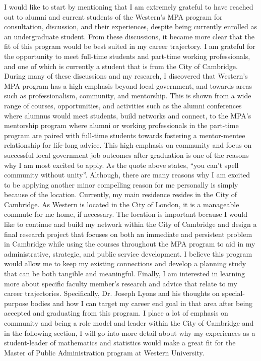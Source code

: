 \documentclass[11pt, a4paper]{awesome-cv}
\begin{document}
\begin{cvletter}
I would like to start by mentioning that I am extremely grateful to have reached out to alumni and current students of the Western's MPA program for consultation, discussion, and their experiences, despite being currently enrolled as an undergraduate student. From these discussions, it became more clear that the fit of this program would be best suited in my career trajectory. I am grateful for the opportunity to meet full-time students and part-time working professionals, and one of which is currently a student that is from the City of Cambridge. During many of these discussions and my research, I discovered that Western's MPA program has a high emphasis beyond local government, and towards areas such as professionalism, community, and mentorship. This is shown from a wide range of courses, opportunities, and activities such as the alumni conferences where alumnus would meet students, build networks and connect, to the MPA's mentorship program where alumni or working professionals in the part-time program are paired with full-time students towards fostering a mentor-mentee relationship for life-long advice. This high emphasis on community and focus on successful local government job outcomes after graduation is one of the reasons why I am most excited to apply. As the quote above states, “you can't spell community without unity”. Although, there are many reasons why I am excited to be applying another minor compelling reason for me personally is simply because of the location. Currently, my main residence resides in the City of Cambridge. As Western is located in the City of London, it is a manageable commute for me home, if necessary. The location is important because I would like to continue and build my network within the City of Cambridge and design a final research project that focuses on both an immediate and persistent problem in Cambridge while using the courses throughout the MPA program to aid in my administrative, strategic, and public service development. I believe this program would allow me to keep my existing connections and develop a planning study that can be both tangible and meaningful. Finally, I am interested in learning more about specific faculty member's research and advice that relate to my career trajectories. Specifically, Dr. Joseph Lyons and his thoughts on special-purpose bodies and how I can target my career end goal in that area after being accepted and graduating from this program. I place a lot of emphasis on community and being a role model and leader within the City of Cambridge and in the following section, I will go into more detail about why my experiences as a student-leader of mathematics and statistics would make a great fit for the Master of Public Administration program at Western University.


\end{cvletter}
\end{document}
